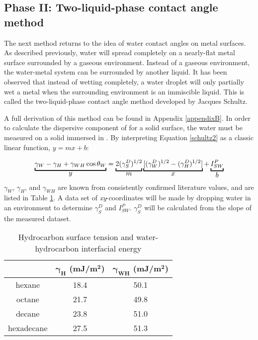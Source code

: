 \subsection{Phase II: Two-liquid-phase contact angle method}

The next method returns to the idea of water contact angles on metal surfaces. As described previously, water will spread completely on a nearly-flat metal surface surrounded by a gaseous environment. Instead of a gaseous environment, the water-metal system can be surrounded by another liquid. It has been observed that instead of wetting completely, a water droplet will only partially wet a metal when the surrounding environment is an immiscible liquid. This is called the two-liquid-phase contact angle method developed by Jacques Schultz.\cite{Schultz1977,Schultz1977a,Schultz1992} 


A full derivation of this method can be found in Appendix \ref{appendixB}. In order to calculate the dispersive component of \gamSV for a solid surface, the water \ca must be measured on a solid immersed in \nalk[s]. By interpreting Equation \ref{schultz2} as a classic linear function, $y = mx + b$:

\[
\underbracket{\gamma_{W}-\gamma_{H}+\gamma_{WH}\cos\theta_{W}}_{\text{\normalsize{$y$}}} =
\underbracket{2(\gamma_{S}^{D})^{1/2}}_{\text{\normalsize{$m$}}}  
\underbracket{[(\gamma_{W}^{D})^{1/2}-(\gamma_{H}^{D})^{1/2}] }_{\text{\normalsize{$x$}}} + 
\underbracket{I_{SW}^{P}}_{\text{\normalsize{$b$}}} 
\] 
$\gamma_{W}$, $\gamma_{H}$, and $\gamma_{WH}$ are known from consistently confirmed literature values,\cite{Chassin1986,Smitthipong2004,Takanashi2013,Nakamura2015} and are listed in Table \ref{knownsurften}. A data set of \textit{xy}-coordinates will be made by dropping water in an \nalk environment to determine $\gamma_{S}^{D}$ and $I_{SW}^{P} $. $\gamma_{S}^{D} $ will be calculated from the slope of the measured dataset. 

\begin{table}[h!]
	\centering
	\caption{Hydrocarbon surface tension and water-hydrocarbon interfacial energy}
	\begin{tabular} { |c||c|c|  } %
		\hline
		\textbf{\nalk[s]}	&\textbf{$\bm{\gamma_{H}}$ (mJ/m$\bm{^{2}}$)}	&\textbf{$\bm{\gamma_{WH}}$ (mJ/m$\bm{^{2}}$)}	\\
		\hline
		hexane		&18.4	&50.1 \\
		\hline
		octane		&21.7	&49.8 \\
		\hline
		decane		&23.8	&51.0 \\
		\hline
		hexadecane	&27.5	&51.3 \\
		\hline
	\end{tabular}
	\label{knownsurften}
\end{table}

